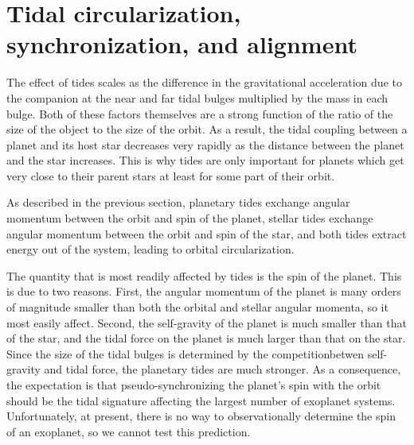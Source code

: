 \section{Tidal circularization, synchronization, and alignment}
%
\label{sec:synchronization_circularization_alignment}

The effect of tides scales as the difference in the gravitational acceleration
due to the companion at the near and far tidal bulges multiplied by the mass in
each bulge. Both of these factors themselves are a strong function of the ratio
of the size of the object to the size of the orbit. As a result, the tidal
coupling between a planet and its host star decreases very rapidly as the
distance between the planet and the star increases. This is why tides are only
important for planets which get very close to their parent stars at least for
some part of their orbit.

As described in the previous section, planetary tides exchange angular
momentum between the orbit and spin of the planet, stellar tides exchange
angular momentum between the orbit and spin of the star, and both tides extract
energy out of the system, leading to orbital circularization. 

The quantity that is most readily affected by tides is the spin of the planet.
This is due to two reasons. First, the angular momentum of the planet is many
orders of magnitude smaller than both the orbital and stellar angular momenta,
so it most easily affect. Second, the self-gravity of the planet is much smaller
than that of the star, and the tidal force on the planet is much larger than
that on the star. Since the size of the tidal bulges is determined by the
competitionbetwen self-gravity and tidal force, the planetary tides are much
stronger. As a consequence, the expectation is that pseudo-synchronizing the
planet's spin with the orbit should be the tidal signature affecting the largest
number of exoplanet systems. Unfortunately, at present, there is no way to
observationally determine the spin of an exoplanet, so we cannot test this
prediction.
